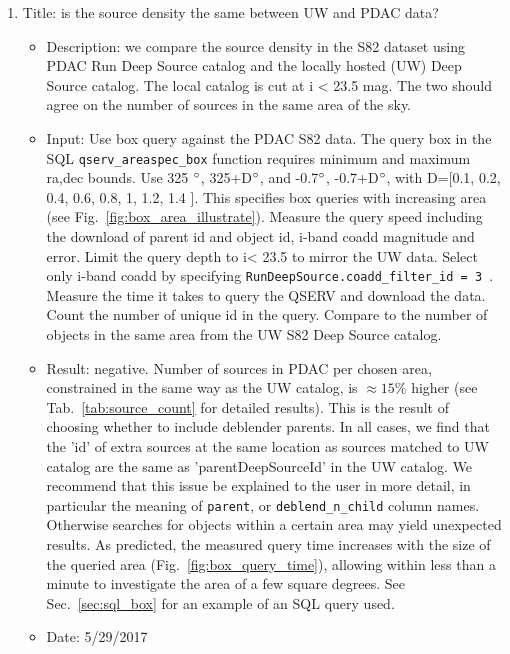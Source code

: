 \documentclass[DM,lsstdraft,toc]{lsstdoc}
\begin{document}
\begin{enumerate}
  \item Title: is the source density the same between UW and PDAC data?
  \begin{itemize}
    \item Description: we compare the source density in the S82 dataset using PDAC Run Deep Source catalog and the locally hosted (UW) Deep Source catalog. The local catalog is cut at i < 23.5 mag.  The two should agree on the number of sources in the same area of the sky.
    \item Input: Use box query against the PDAC S82 data. The query box in the SQL \verb|qserv_areaspec_box| function requires minimum and maximum ra,dec bounds.  Use 325 $\degree$, 325+D$\degree$, and -0.7$\degree$, -0.7+D$\degree$, with D=[0.1, 0.2, 0.4, 0.6, 0.8, 1, 1.2, 1.4 ]. This specifies box queries with increasing area (see Fig.~\ref{fig:box_area_illustrate}). Measure the query speed including the download of  parent id and object id,  i-band coadd magnitude and error. Limit the query depth to i< 23.5 to mirror the UW data. Select only i-band coadd by specifying \verb|RunDeepSource.coadd_filter_id = 3 |. Measure the time it takes to query the QSERV and download the data. Count the number of unique id in the query. Compare to the number of objects in the same area from the UW S82 Deep Source catalog.
    \item Result: negative. Number of sources in PDAC per chosen area, constrained in the same way as the UW catalog, is $\approx15\% $ higher (see Tab.~\ref{tab:source_count} for detailed results). This is the result of choosing whether to include deblender parents. In all cases, we find that the 'id' of extra sources at the same location as sources matched to UW catalog are the same as 'parentDeepSourceId' in the UW catalog.   We recommend that this issue  be explained to the user in more detail, in particular the meaning of  \verb|parent|, or \verb|deblend_n_child| column names. Otherwise searches for objects within a certain area may yield unexpected results.  As predicted, the measured query  time increases with the size of the queried area (Fig.~\ref{fig:box_query_time}), allowing within less than a minute to investigate the area of a few square degrees. See Sec.~\ref{sec:sql_box} for an example of an SQL query used.
    \item Date: 5/29/2017
    \end{itemize}
\end{enumerate}
\end{document}
